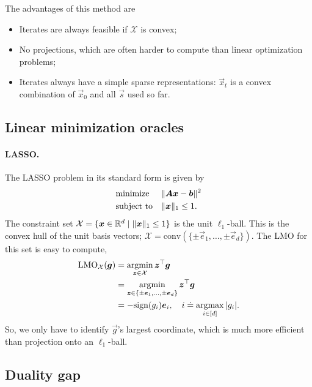 The advantages of this method are
\begin{itemize}
    \item Iterates are always feasible if $\mathcal{X}$ is convex;
    \item No projections, which are often harder to compute than linear optimization problems;
    \item Iterates always have a simple sparse representations: $\vec{x}_t$ is a convex combination of
          $\vec{x}_0$ and all $\vec{s}$ used so far.
\end{itemize}

\subsection{Linear minimization oracles}

\paragraph{LASSO.}

The LASSO problem in its standard form is given by \[
    \begin{aligned}
         & \text{minimize}   &  & \| \bm{A} \bm{x} - \bm{b} \|^2 \\
         & \text{subject to} &  & \| \bm{x} \|_1 \leq 1.
    \end{aligned}
\]
The constraint set $\mathcal{X} = \{ \bm{x} \in \mathbb{R}^d \mid \| \bm{x} \|_1 \leq 1 \}$ is the unit
$\ell_1$-ball. This is the convex hull of the unit basis vectors; $\mathcal{X} = \mathrm{conv}(\{
    \pm \vec{e}_1, \ldots, \pm \vec{e}_d \})$. The LMO for this set is easy to compute,
\begin{align*}
    \mathrm{LMO}_{\mathcal{X}}(\bm{g}) & = \operatorname*{argmin}_{\bm{z}\in \mathcal{X}} \bm{z}^\top \bm{g}                                 \\
                                        & = \operatorname*{argmin}_{\bm{z} \in \{ \pm \bm{e}_1, \ldots, \pm \bm{e}_d \}} \bm{z}^\top \bm{g} \\
                                        & = -\mathrm{sign}(g_i) \bm{e}_i, \quad i \doteq \operatorname*{argmax}_{i \in [d]} |g_i|.
\end{align*}
So, we only have to identify $\vec{g}$'s largest coordinate, which is much more efficient than
projection onto an $\ell_1$-ball.

\subsection{Duality gap}

